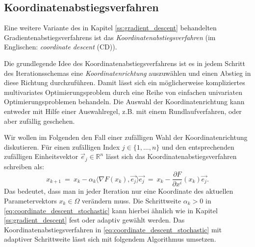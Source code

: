 \subsection{Koordinatenabstiegsverfahren}
\label{ss:coordinate_descent}
Eine weitere Variante des in Kapitel \ref{ss:gradient_descent} behandelten Gradientenabstiegsverfahrens ist das \textit{Koordinatenabstiegsverfahren} (im Englischen: \textit{coordinate descent} (CD)). 

Die grundlegende Idee des Koordinatenabstiegsverfahrens ist es in jedem Schritt des Iterationsschemas eine \textit{Koordinatenrichtung} auszuwählen und einen Abstieg in diese Richtung durchzuführen. 
Damit lässt sich ein möglicherweise kompliziertes multivariates Optimierungsproblem durch eine Reihe von einfachen univariaten Optimierungsproblemen behandeln.
Die Auswahl der Koordinatenrichtung kann entweder mit Hilfe einer Auswahlregel, z.B. mit einem Rundlaufverfahren, oder aber zufällig geschehen.

Wir wollen im Folgenden den Fall einer zufälligen Wahl der Koordinatenrichtung diskutieren.
Für einen zufälligen Index $j \in \lbrace 1,\ldots,n\rbrace$ und den entsprechenden zufälligen Einheitsvektor $\vec{e}_j \in \mathbb{R}^n$ lässt sich das Koordinatenabstiegsverfahren schreiben als:
\begin{equation}
\label{eq:coordinate_descent_stochastic}
x_{k+1} \ = \ x_k - \alpha_k \langle \nabla F(x_k), \vec{e_j} \rangle \vec{e_j} \ = \ x_k - \frac{\partial F}{\partial x^i}(x_k) \vec{e_j}.
\end{equation}
Das bedeutet, dass man in jeder Iteration nur eine Koordinate des aktuellen Parametervektors $x_k \in \Omega$ verändern muss.
Die Schrittweite $\alpha_k > 0$ in \eqref{eq:coordinate_descent_stochastic} kann hierbei ähnlich wie in Kapitel \ref{ss:gradient_descent} fest oder adaptiv gewählt werden.
Das Koordinatenabstiegsverfahren in \eqref{eq:coordinate_descent_stochastic} mit adaptiver Schrittweite lässt sich mit folgendem Algorithmus umsetzen.

